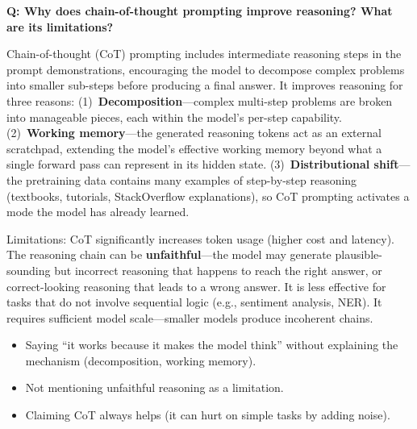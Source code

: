 \begin{interviewq}
\end{interviewq}

\begin{interviewq}
\textbf{Q: Why does chain-of-thought prompting improve reasoning? What are
its limitations?}

 \quad {} \quad
\badgefreq{\freqhigh}

\stronganswer
Chain-of-thought (CoT) prompting includes intermediate reasoning steps in
the prompt demonstrations, encouraging the model to decompose complex
problems into smaller sub-steps before producing a final answer.  It
improves reasoning for three reasons: (1)~\textbf{Decomposition}---complex
multi-step problems are broken into manageable pieces, each within the
model's per-step capability.  (2)~\textbf{Working memory}---the generated
reasoning tokens act as an external scratchpad, extending the model's
effective working memory beyond what a single forward pass can represent
in its hidden state.  (3)~\textbf{Distributional shift}---the pretraining
data contains many examples of step-by-step reasoning (textbooks, tutorials,
StackOverflow explanations), so CoT prompting activates a mode the model has
already learned.

Limitations: CoT significantly increases token usage (higher cost and
latency).  The reasoning chain can be \textbf{unfaithful}---the model may
generate plausible-sounding but incorrect reasoning that happens to reach
the right answer, or correct-looking reasoning that leads to a wrong answer.
It is less effective for tasks that do not involve sequential logic (e.g.,
sentiment analysis, NER).  It requires sufficient model scale---smaller models
produce incoherent chains.

\redflags
\begin{itemize}
\item Saying ``it works because it makes the model think'' without explaining
  the mechanism (decomposition, working memory).
\item Not mentioning unfaithful reasoning as a limitation.
\item Claiming CoT always helps (it can hurt on simple tasks by adding noise).
\end{itemize}



\end{interviewq}
